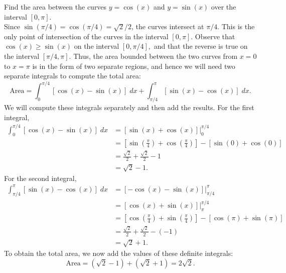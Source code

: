 \documentclass[handout]{ximera}
\begin{document}
\begin{example}[example 7]
Find the area between the curves $y = \cos(x)$ and $y=\sin(x)$ over the interval $[0, \pi]$.\\

 
Since $\sin(\pi/4) = \cos(\pi/4) = \sqrt2 / 2$, the curves intersect at $\pi/4$.  This is the only point of intersection of the curves in
the interval $[0, \pi]$. Observe that $\cos(x) \geq \sin(x)$ on the interval $[0, \pi/4],$ and
that the reverse is true on the interval $[\pi/4, \pi]$.
Thus, the area bounded between the two curves from $x = 0$ to $x = \pi$ is in the form of two separate regions, and hence 
we will need two separate integrals to compute the total area:
\[
\text{Area} = \int_0^{\pi/4} \left[\cos(x) - \sin(x)\right] \; dx + \int_{\pi/4}^\pi \left[\sin(x) -\cos(x)\right] \; dx.
\]
We will compute these integrals separately and then add the results.
For the first integral,
\begin{align*}
\int_0^{\pi/4} \left[\cos(x) - \sin(x)\right] \; dx &= \left[\sin(x) + \cos(x)\right]\bigg|_0^{\pi/4}\\
                                                    &= \left[\sin(\tfrac{\pi}{4}) + \cos(\tfrac{\pi}{4})\right]-\left[\sin(0) + \cos(0)\right]\\
                                                    &= \tfrac{\sqrt 2}{2} + \tfrac{\sqrt 2}{2} - 1\\
                                                    &= \sqrt{2} - 1.
\end{align*}
For the second integral,
\begin{align*}
\int_{\pi/4}^\pi \left[\sin(x) -\cos(x)\right] \; dx &= \left[-\cos(x) - \sin(x) \right]\bigg|_{\pi/4}^{\pi} \\
                                                     &= \left[\cos(x) + \sin(x)\right]\bigg|_{\pi}^{\pi/4}\\
                                                     &= \left[\cos(\tfrac{\pi}{4}) + \sin(\tfrac{\pi}{4})\right]-\left[\cos(\pi) + \sin(\pi)\right]\\
                                                     &= \tfrac{\sqrt 2}{2} + \tfrac{\sqrt 2}{2} - (-1)\\
                                                     &= \sqrt{2} + 1.
\end{align*}                                             
To obtain the total area, we now add the values of these definite integrals:
\[
\text{Area} = (\sqrt 2 - 1) + (\sqrt 2 + 1) = 2\sqrt{2}.
\]


\end{example}
\end{document}
